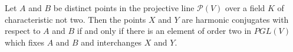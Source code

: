 Let $A$ and $B$ be distinct points in the projective line $\mathcal{P}(V)$ over a field $K$ of characteristic not two. Then the points $X$ and $Y$ are harmonic conjugates with respect to $A$ and $B$ if and only if there is an element of order two in $PGL(V)$ which fixes $A$ and $B$ and interchanges $X$ and $Y$.
